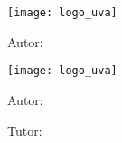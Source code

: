 \documentclass{subfiles}
\begin{document}

  \begin{titlepage}

    \centering
    \texttt{[image: logo\_uva]}\par\vspace{1cm}

    {\scshape\Huge \theschool \par}
    \vspace{0.5cm}

    {\scshape\Large \thesubject\par}
    \vspace{1.25cm}

    {\scshape\Large \thegrade\par}
    \vspace{4cm}

    {\Huge\textbf{\thetitle}\par}
    \vspace{4cm}


    {\Large\hfill Autor: \par}
    {\Large\hfill\bfseries \theauthor\par}
    \vfill

  \end{titlepage}

  \clearpage\mbox{}\thispagestyle{empty}\clearpage

  \begin{titlepage}

    \centering
    \texttt{[image: logo\_uva]}\par\vspace{1cm}

    {\scshape\Huge \theschool \par}
    \vspace{0.5cm}

    {\scshape\Large \thesubject\par}
    \vspace{1.25cm}

    {\scshape\Large \thegrade\par}
    \vspace{4cm}

    {\Huge\textbf{\thetitle}\par}
    \vspace{4cm}


    {\Large\hfill Autor: \par}
    {\Large\hfill\bfseries \theauthor\par}
    \vspace{0.5cm}

    {\Large\hfill Tutor: \par}
    {\Large\hfill\bfseries \thesupervisor\par}
    \vfill

  \end{titlepage}

  \clearpage\mbox{}\thispagestyle{empty}\clearpage

  \restoregeometry
  \setcounter{page}{1}
\end{document}
